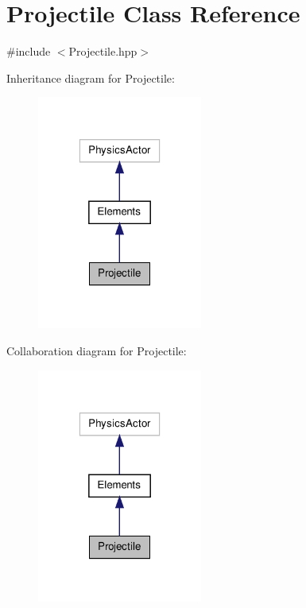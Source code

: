 \hypertarget{class_projectile}{\section{Projectile Class Reference}
\label{class_projectile}
}


{\ttfamily \#include $<$Projectile.\-hpp$>$}



Inheritance diagram for Projectile\-:\nopagebreak
\begin{figure}[H]
\begin{center}
\leavevmode
\includegraphics[width=154pt]{class_projectile__inherit__graph}
\end{center}
\end{figure}


Collaboration diagram for Projectile\-:\nopagebreak
\begin{figure}[H]
\begin{center}
\leavevmode
\includegraphics[width=154pt]{class_projectile__coll__graph}
\end{center}
\end{figure}
